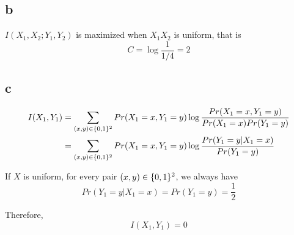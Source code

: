 \documentclass{article}
\begin{document}
\subsection{b}

$I(X_1, X_2; Y_1, Y_2)$ is maximized when $X_1 X_2$ is uniform, that is
$$
    C = \log \frac{1}{1/4} = 2
$$

\subsection{c}

\begin{align*}
    I(X_1, Y_1)
    &= \sum_{(x, y) \in \{0, 1\}^2} Pr(X_1 = x, Y_1 = y) \log \frac{Pr(X_1 = x, Y_1 = y)}{Pr(X_1 = x) Pr(Y_1 = y)} \\
    &= \sum_{(x, y) \in \{0, 1\}^2} Pr(X_1 = x, Y_1 = y) \log \frac{Pr(Y_1 = y | X_1 = x)}{Pr(Y_1 = y)} \\
\end{align*}

If $X$ is uniform, for every pair $(x, y) \in \{0, 1\}^2$, we always have
$$
    Pr(Y_1 = y | X_1 = x) = Pr(Y_1 = y) = \frac{1}{2}
$$

Therefore, 
$$
    I(X_1, Y_1) = 0
$$
\end{document}
